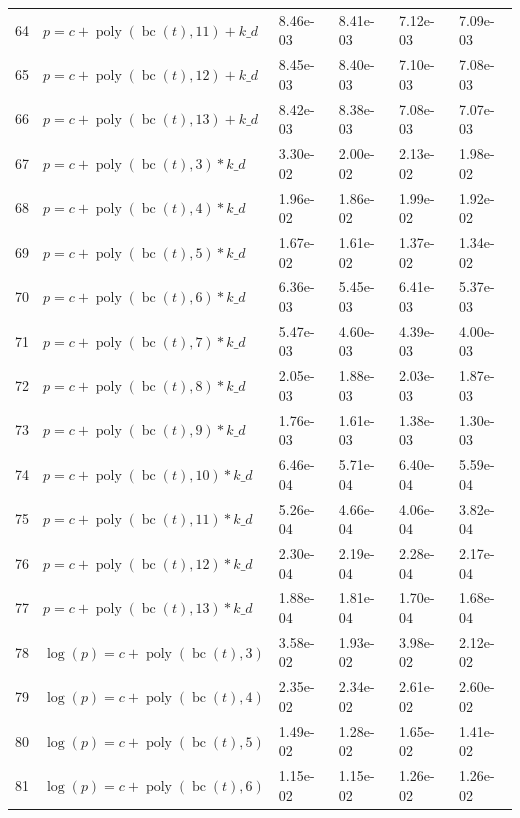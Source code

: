 \documentclass[12pt,a4paper]{article}
\DeclareMathOperator{\bc}{bc}
\DeclareMathOperator{\poly}{poly}
\begin{document}
\begin{longtable}[t]{ll>{\raggedleft\arraybackslash}p{2cm}>{\raggedleft\arraybackslash}p{2cm}>{\raggedleft\arraybackslash}p{2cm}>{\raggedleft\arraybackslash}p{2cm}}
64 & $p = c + \poly\left( \bc(t), 11 \right) + k\_d$ & 8.46e-03 & 8.41e-03 & 7.12e-03 & 7.09e-03\\
\rowcolor{gray!6}  65 & $p = c + \poly\left( \bc(t), 12 \right) + k\_d$ & 8.45e-03 & 8.40e-03 & 7.10e-03 & 7.08e-03\\
66 & $p = c + \poly\left( \bc(t), 13 \right) + k\_d$ & 8.42e-03 & 8.38e-03 & 7.08e-03 & 7.07e-03\\
\rowcolor{gray!6}  67 & $p = c + \poly\left( \bc(t), 3 \right) * k\_d$ & 3.30e-02 & 2.00e-02 & 2.13e-02 & 1.98e-02\\
68 & $p = c + \poly\left( \bc(t), 4 \right) * k\_d$ & 1.96e-02 & 1.86e-02 & 1.99e-02 & 1.92e-02\\
\rowcolor{gray!6}  69 & $p = c + \poly\left( \bc(t), 5 \right) * k\_d$ & 1.67e-02 & 1.61e-02 & 1.37e-02 & 1.34e-02\\
70 & $p = c + \poly\left( \bc(t), 6 \right) * k\_d$ & 6.36e-03 & 5.45e-03 & 6.41e-03 & 5.37e-03\\
\rowcolor{gray!6}  71 & $p = c + \poly\left( \bc(t), 7 \right) * k\_d$ & 5.47e-03 & 4.60e-03 & 4.39e-03 & 4.00e-03\\
72 & $p = c + \poly\left( \bc(t), 8 \right) * k\_d$ & 2.05e-03 & 1.88e-03 & 2.03e-03 & 1.87e-03\\
\rowcolor{gray!6}  73 & $p = c + \poly\left( \bc(t), 9 \right) * k\_d$ & 1.76e-03 & 1.61e-03 & 1.38e-03 & 1.30e-03\\
74 & $p = c + \poly\left( \bc(t), 10 \right) * k\_d$ & 6.46e-04 & 5.71e-04 & 6.40e-04 & 5.59e-04\\
\rowcolor{gray!6}  75 & $p = c + \poly\left( \bc(t), 11 \right) * k\_d$ & 5.26e-04 & 4.66e-04 & 4.06e-04 & 3.82e-04\\
76 & $p = c + \poly\left( \bc(t), 12 \right) * k\_d$ & 2.30e-04 & 2.19e-04 & 2.28e-04 & 2.17e-04\\
\rowcolor{gray!6}  77 & $p = c + \poly\left( \bc(t), 13 \right) * k\_d$ & 1.88e-04 & 1.81e-04 & 1.70e-04 & 1.68e-04\\
78 & $\log(p) = c + \poly\left( \bc(t), 3 \right)$ & 3.58e-02 & 1.93e-02 & 3.98e-02 & 2.12e-02\\
\rowcolor{gray!6}  79 & $\log(p) = c + \poly\left( \bc(t), 4 \right)$ & 2.35e-02 & 2.34e-02 & 2.61e-02 & 2.60e-02\\
80 & $\log(p) = c + \poly\left( \bc(t), 5 \right)$ & 1.49e-02 & 1.28e-02 & 1.65e-02 & 1.41e-02\\
\rowcolor{gray!6}  81 & $\log(p) = c + \poly\left( \bc(t), 6 \right)$ & 1.15e-02 & 1.15e-02 & 1.26e-02 & 1.26e-02\\

\end{longtable}
\end{document}
